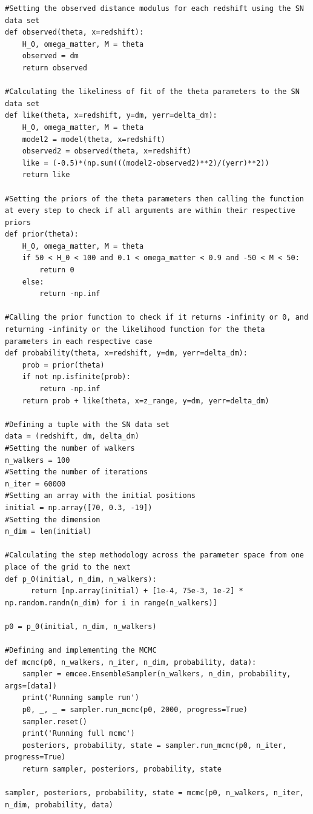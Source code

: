 \documentclass[12pt, a4paper]{article}
\begin{document}
\begin{verbatim}
#Setting the observed distance modulus for each redshift using the SN data set
def observed(theta, x=redshift):
    H_0, omega_matter, M = theta
    observed = dm
    return observed

#Calculating the likeliness of fit of the theta parameters to the SN data set
def like(theta, x=redshift, y=dm, yerr=delta_dm):
    H_0, omega_matter, M = theta
    model2 = model(theta, x=redshift)
    observed2 = observed(theta, x=redshift)
    like = (-0.5)*(np.sum(((model2-observed2)**2)/(yerr)**2))
    return like

#Setting the priors of the theta parameters then calling the function at every step to check if all arguments are within their respective priors
def prior(theta):
    H_0, omega_matter, M = theta
    if 50 < H_0 < 100 and 0.1 < omega_matter < 0.9 and -50 < M < 50:
        return 0
    else:
        return -np.inf

#Calling the prior function to check if it returns -infinity or 0, and returning -infinity or the likelihood function for the theta parameters in each respective case
def probability(theta, x=redshift, y=dm, yerr=delta_dm):
    prob = prior(theta)
    if not np.isfinite(prob):
        return -np.inf
    return prob + like(theta, x=z_range, y=dm, yerr=delta_dm)

#Defining a tuple with the SN data set
data = (redshift, dm, delta_dm)
#Setting the number of walkers
n_walkers = 100
#Setting the number of iterations
n_iter = 60000
#Setting an array with the initial positions
initial = np.array([70, 0.3, -19])
#Setting the dimension
n_dim = len(initial)

#Calculating the step methodology across the parameter space from one place of the grid to the next
def p_0(initial, n_dim, n_walkers):
      return [np.array(initial) + [1e-4, 75e-3, 1e-2] * np.random.randn(n_dim) for i in range(n_walkers)]

p0 = p_0(initial, n_dim, n_walkers)

#Defining and implementing the MCMC
def mcmc(p0, n_walkers, n_iter, n_dim, probability, data):
    sampler = emcee.EnsembleSampler(n_walkers, n_dim, probability, args=[data])
    print('Running sample run')
    p0, _, _ = sampler.run_mcmc(p0, 2000, progress=True)
    sampler.reset()
    print('Running full mcmc')
    posteriors, probability, state = sampler.run_mcmc(p0, n_iter, progress=True)
    return sampler, posteriors, probability, state

sampler, posteriors, probability, state = mcmc(p0, n_walkers, n_iter, n_dim, probability, data)


\end{verbatim}
\end{document}

